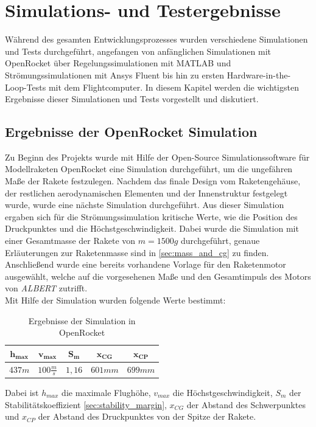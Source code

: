 \chapter{Simulations- und Testergebnisse}
\label{ch:simulationsergebnisse}
Während des gesamten Entwicklungsprozesses wurden verschiedene Simulationen und Tests durchgeführt, angefangen von anfänglichen Simulationen mit OpenRocket über Regelungssimulationen mit MATLAB und Strömungssimulationen mit Ansys Fluent bis hin zu ersten Hardware-in-the-Loop-Tests mit dem Flightcomputer. In diesem Kapitel werden die wichtigsten Ergebnisse dieser Simulationen und Tests vorgestellt und diskutiert.
\section{Ergebnisse der OpenRocket Simulation}
\label{sec:ergebnisse_openrocket}
Zu Beginn des Projekts wurde mit Hilfe der Open-Source Simulationssoftware für Modellraketen OpenRocket eine Simulation durchgeführt, um die ungefähren Maße der Rakete festzulegen. Nachdem das finale Design vom Raketengehäuse, der restlichen aerodynamischen Elementen und der Innenstruktur festgelegt wurde, wurde eine nächste Simulation durchgeführt. Aus dieser Simulation ergaben sich für die Strömungssimulation kritische Werte, wie die Position des Druckpunktes und die Höchstgeschwindigkeit. Dabei wurde die Simulation mit einer Gesamtmasse der Rakete von $m = 1500g$ durchgeführt, genaue Erläuterungen zur Raketenmasse sind in \ref{sec:mass_and_cg} zu finden. Anschließend wurde eine bereits vorhandene Vorlage für den Raketenmotor ausgewählt, welche auf die vorgesehenen Maße und den Gesamtimpuls des Motors von \textit{ALBERT} zutrifft.
\\
Mit Hilfe der Simulation wurden folgende Werte bestimmt:
\begin{table}[H]
    \centering
    \begin{tabular}{|c|c|c|c|c|}
       \hline 
       $\mathbf{h_{max}}$ & $\mathbf{v_{max}}$ & $\mathbf{S_m}$ & $\mathbf{x_{CG}}$ & $\mathbf{x_{CP}}$ \\
       \hline
       $437m$ & $100\frac{m}{s}$ & $1,16$ & $601mm$ & $699mm$ \\
       \hline
    \end{tabular}
    \caption{Ergebnisse der Simulation in OpenRocket}
    \label{tab:openrocket_sim_results}
\end{table}
Dabei ist $h_{max}$ die maximale Flughöhe, $v_{max}$ die Höchstgeschwindigkeit, $S_m$ der Stabilitätskoeffizient \ref{sec:stability_margin}, $x_{CG}$ der Abstand des Schwerpunktes und $x_{CP}$ der Abstand des Druckpunktes von der Spitze der Rakete. 
